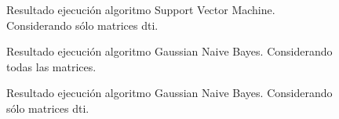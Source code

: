 \begin{figure}[H]
\centering
{}
\caption{Resultado ejecución algoritmo Support Vector Machine. Considerando sólo matrices \gls{dti}.}
\label{figure:svmdti}
\end{figure}

\begin{figure}[H]
\centering
{}
\caption{Resultado ejecución algoritmo Gaussian Naive Bayes. Considerando todas las matrices.}
\label{figure:bayesall}
\end{figure}

\begin{figure}[H]
\centering
{}
\caption{Resultado ejecución algoritmo Gaussian Naive Bayes. Considerando sólo matrices \gls{dti}.}
\label{figure:bayesdti}
\end{figure}


